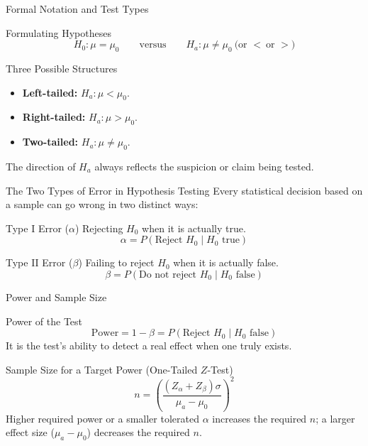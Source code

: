 \documentclass[10pt, aspectratio=169]{beamer}
\begin{document}
\begin{frame}{Formal Notation and Test Types}
  \footnotesize
  \begin{block}{Formulating Hypotheses}
    $$H_0: \mu = \mu_0 \qquad \text{versus} \qquad H_a: \mu \neq \mu_0 \ \text{(or } < \ \text{or } > \text{)}$$
  \end{block}
  \pause

  \vspace{0.1cm}
  \begin{alertblock}{Three Possible Structures}
    \begin{itemize}\itemsep=0.05cm
      \item \textbf{Left-tailed:} $H_a: \mu < \mu_0$.
      \item \textbf{Right-tailed:} $H_a: \mu > \mu_0$.
      \item \textbf{Two-tailed:} $H_a: \mu \neq \mu_0$.
    \end{itemize}
    The direction of $H_a$ always reflects the suspicion or claim being tested.
  \end{alertblock}
\end{frame}

\begin{frame}{The Two Types of Error in Hypothesis Testing}
  \footnotesize
  Every statistical decision based on a sample can go wrong in two distinct ways: \pause

  \vspace{0.1cm}
  \begin{block}{Type I Error ($\alpha$)}
    Rejecting $H_0$ when it is actually true.
    $$\alpha = P(\text{Reject } H_0 \mid H_0 \text{ true})$$
  \end{block}
  \pause

  \vspace{0.1cm}
  \begin{alertblock}{Type II Error ($\beta$)}
    Failing to reject $H_0$ when it is actually false.
    $$\beta = P(\text{Do not reject } H_0 \mid H_0 \text{ false})$$
  \end{alertblock}
\end{frame}

\begin{frame}{Power and Sample Size}
  \footnotesize
  \begin{block}{Power of the Test}
    $$\text{Power} = 1-\beta = P(\text{Reject } H_0 \mid H_0 \text{ false})$$
    It is the test's ability to detect a real effect when one truly exists.
  \end{block}
  \pause

  \vspace{0.1cm}
  \begin{alertblock}{Sample Size for a Target Power (One-Tailed $Z$-Test)}
    $$n = \left(\frac{(Z_\alpha+Z_\beta)\sigma}{\mu_a-\mu_0}\right)^2$$
    Higher required power or a smaller tolerated $\alpha$ increases the required $n$; a larger effect size ($\mu_a-\mu_0$) decreases the required $n$.
  \end{alertblock}
\end{frame}
\end{document}
